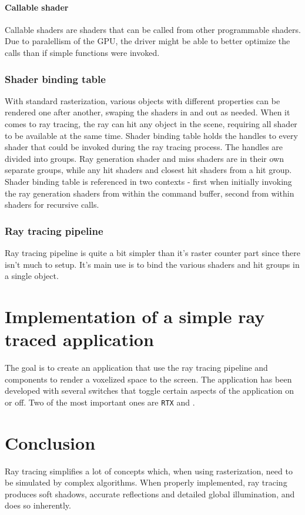 \documentclass[times, utf8, zavrsni, numeric]{fer}
\begin{document}
\subsubsection{Callable shader}
Callable shaders are shaders that can be called from other programmable shaders. Due to paralellism of the GPU, the driver might be able to better optimize the calls than if simple functions were invoked.

\subsection{Shader binding table}
With standard rasterization, various objects with different properties can be rendered one after another, swaping the shaders in and out as needed. When it comes to ray tracing, the ray can hit any object in the scene, requiring all shader to be available at the same time. Shader binding table holds the handles to every shader that could be invoked during the ray tracing process. The handles are divided into groups. Ray generation shader and miss shaders are in their own separate groups, while any hit shaders and closest hit shaders from a hit group. Shader binding table is referenced in two contexts - first when initially invoking the ray generation shaders from within the command buffer, second from within shaders for recursive calls.

\subsection{Ray tracing pipeline}
Ray tracing pipeline is quite a bit simpler than it's raster counter part since there isn't much to setup. It's main use is to bind the various shaders and hit groups in a single object. 

\chapter{Implementation of a simple ray traced application}
The goal is to create an application that use the ray tracing pipeline and components to render a voxelized space to the screen. The application has been developed with several switches that toggle certain aspects of the application on or off. Two of the most important ones are \texttt{RTX} and .

\chapter{Conclusion}
Ray tracing simplifies a lot of concepts which, when using rasterization, need to be simulated by complex algorithms. When properly implemented, ray tracing produces soft shadows, accurate reflections and detailed global illumination, and does so inherently.
\end{document}
